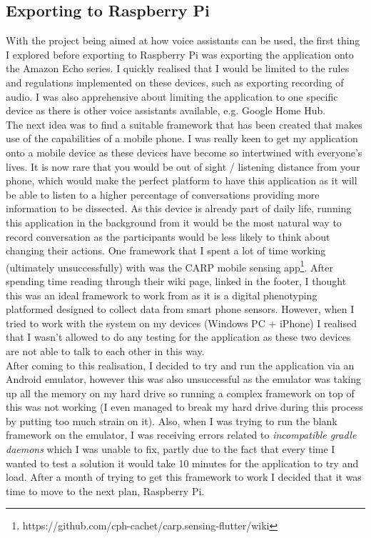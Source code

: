 \documentclass[a4paper,11pt]{report}
\begin{document}
\subsection{Exporting to Raspberry Pi}
With the project being aimed at how voice assistants can be used, the first thing I explored before exporting to Raspberry Pi was exporting the application onto the Amazon Echo series. I quickly realised that I would be limited to the rules and regulations implemented on these devices, such as exporting recording of audio. I was also apprehensive about limiting the application to one specific device as there is other voice assistants available, e.g. Google Home Hub.\\

The next idea was to find a suitable framework that has been created that makes use of the capabilities of a mobile phone. I was really keen to get my application onto a mobile device as these devices have become so intertwined with everyone’s lives. It is now rare that you would be out of sight / listening distance from your phone, which would make the perfect platform to have this application as it will be able to listen to a higher percentage of conversations providing more information to be dissected. As this device is already part of daily life, running this application in the background from it would be the most natural way to record conversation as the participants would be less likely to think about changing their actions. One framework that I spent a lot of time working (ultimately unsuccessfully) with was the CARP mobile sensing app\footnote{ https://github.com/cph-cachet/carp.sensing-flutter/wiki}. After spending time reading through their wiki page, linked in the footer, I thought this was an ideal framework to work from as it is a digital phenotyping platformed designed to collect data from smart phone sensors. However, when I tried to work with the system on my devices (Windows PC + iPhone) I realised that I wasn’t allowed to do any testing for the application as these two devices are not able to talk to each other in this way. \\

After coming to this realisation, I decided to try and run the application via an Android emulator, however this was also unsuccessful as the emulator was taking up all the memory on my hard drive so running a complex framework on top of this was not working (I even managed to break my hard drive during this process by putting too much strain on it). Also, when I was trying to run the blank framework on the emulator, I was receiving errors related to \textit{incompatible gradle daemons} which I was unable to fix, partly due to the fact that every time I wanted to test a solution it would take 10 minutes for the application to try and load. After a month of trying to get this framework to work I decided that it was time to move to the next plan, Raspberry Pi.\\
\end{document}
